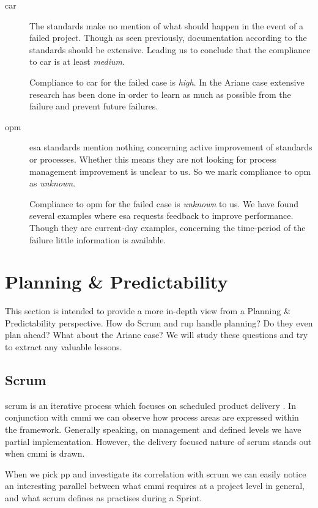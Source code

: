 \begin{description}

\item[\ac{car}]
The standards make no mention of what should happen in the event of a failed project. Though as seen previously, documentation according to the standards should be extensive.
Leading us to conclude that the compliance to \ac{car} is at least \textit{medium}.

Compliance to \ac{car} for the failed case is \textit{high}. In the Ariane case extensive research has been done in order to learn as much as possible from the failure and prevent future failures. 

\item[\ac{opm}]
\ac{esa} standards mention nothing concerning active improvement of standards or processes. Whether this means they are not looking for process management improvement is unclear to us.
So we mark compliance to \ac{opm} as \textit{unknown}.

Compliance to \ac{opm} for the failed case is \textit{unknown} to us. We have found several examples where \ac{esa} requests feedback to improve performance. Though they are current-day examples, concerning the time-period of the failure little information is available.

\end{description}

\section{Planning \& Predictability}
This section is intended to provide a more in-depth view from a Planning \& Predictability perspective. How do Scrum and \ac{rup} handle planning? Do they even plan ahead? What about the Ariane case? We will study these questions and try to extract any valuable lessons.

\subsection{Scrum}
\ac{scrum} is an iterative process which focuses on scheduled product delivery \citep{schwaber2011scrum}. In conjunction with \ac{cmmi} we can observe how process areas are expressed within the framework. Generally speaking, on management and defined levels we have partial implementation.
However, the delivery focused nature of \ac{scrum} stands out when \ac{cmmi} is drawn.

When we pick \acrlong{pp} and investigate its correlation with \ac{scrum} we can easily notice an interesting parallel between what \ac{cmmi} requires at a project level in general, and what \ac{scrum} defines as practises during a Sprint.

